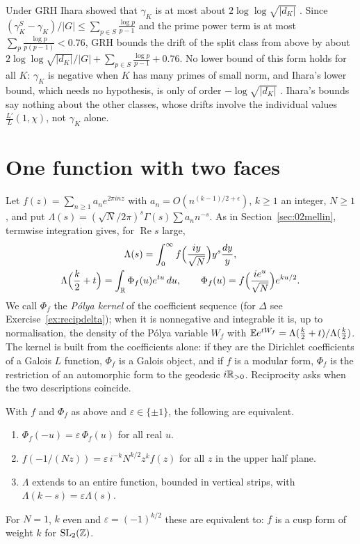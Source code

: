Under GRH Ihara showed that $\gamma_K$ is at most about $2\log\log\sqrt{|d_K|}$ \cite{ihara2006}. Since $(\gamma_K^S-\gamma_K)/|G|\le\sum_{p\in S}\frac{\log p}{p-1}$ and the prime power term is at most $\sum_p\frac{\log p}{p(p-1)}<0.76$, GRH bounds the drift of the split class from above by about $2\log\log\sqrt{|d_K|}/|G|+\sum_{p\in S}\frac{\log p}{p-1}+0.76$. No lower bound of this form holds for all $K$: $\gamma_K$ is negative when $K$ has many primes of small norm, and Ihara's lower bound, which needs no hypothesis, is only of order $-\log\sqrt{|d_K|}$ \cite{ihara2006}. Ihara's bounds say nothing about the other classes, whose drifts involve the individual values $\frac{L'}L(1,\chi)$, not $\gamma_K$ alone.

\section{One function with two faces}\label{sec:recipfaces}

Let $f(z)=\sum_{n\ge1}a_ne^{2\pi inz}$ with $a_n=O(n^{(k-1)/2+\epsilon})$, $k\ge1$ an integer, $N\ge1$, and put $\Lambda(s)=(\sqrt N/2\pi)^s\Gamma(s)\sum a_nn^{-s}$. As in Section~\ref{sec:02mellin}, termwise integration gives, for $\operatorname{Re}s$ large,
\begin{equation}\label{eq:recipmellin}
\begin{gathered}
\Lambda(s)=\int_0^\infty f\Bigl(\frac{iy}{\sqrt N}\Bigr)y^{s}\frac{dy}y,\\
\Lambda\Bigl(\frac k2+t\Bigr)=\int_{\mathbb{R}}\Phi_f(u)e^{tu}\,du,\qquad \Phi_f(u)=f\Bigl(\frac{ie^u}{\sqrt N}\Bigr)e^{ku/2}.
\end{gathered}
\end{equation}
We call $\Phi_f$ the \emph{P\'olya kernel} of the coefficient sequence (for $\Delta$ see Exercise~\ref{ex:recipdelta}); when it is nonnegative and integrable it is, up to normalisation, the density of the P\'olya variable $W_f$ with $\mathbb{E} e^{tW_f}=\Lambda(\frac k2+t)/\Lambda(\frac k2)$. The kernel is built from the coefficients alone: if they are the Dirichlet coefficients of a Galois $L$ function, $\Phi_f$ is a Galois object, and if $f$ is a modular form, $\Phi_f$ is the restriction of an automorphic form to the geodesic $i\mathbb{R}_{>0}$. Reciprocity asks when the two descriptions coincide.

\begin{proposition}\label{prop:recipsym}
With $f$ and $\Phi_f$ as above and $\varepsilon\in\{\pm1\}$, the following are equivalent.
\begin{enumerate}
\item[(i)] $\Phi_f(-u)=\varepsilon\,\Phi_f(u)$ for all real $u$.
\item[(ii)] $f(-1/(Nz))=\varepsilon\,i^{-k}N^{k/2}z^kf(z)$ for all $z$ in the upper half plane.
\item[(iii)] $\Lambda$ extends to an entire function, bounded in vertical strips, with $\Lambda(k-s)=\varepsilon\Lambda(s)$.
\end{enumerate}
For $N=1$, $k$ even and $\varepsilon=(-1)^{k/2}$ these are equivalent to: $f$ is a cusp form of weight $k$ for $\mathrm{SL}_2(\mathbb{Z})$.
\end{proposition}

